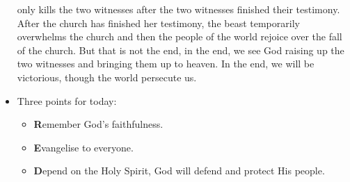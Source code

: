 \begin{itemize}
{  only kills the two witnesses after the two witnesses finished their
  testimony.  After the church has finished her testimony, the beast
  temporarily overwhelms the church and then the people of the world rejoice
  over the fall of the church.  But that is not the end, in the end, we see
  God raising up the two witnesses and bringing them up to heaven.  In the
  end, we will be victorious, though the world persecute us.  }
  \item{Three points for today: 
  \begin{itemize}
    \item{\textbf{R}emember God's faithfulness.}
    \item{\textbf{E}vangelise to everyone.}
    \item{\textbf{D}epend on the Holy Spirit, God will defend and protect His people.}
  \end{itemize}}
\end{itemize}
